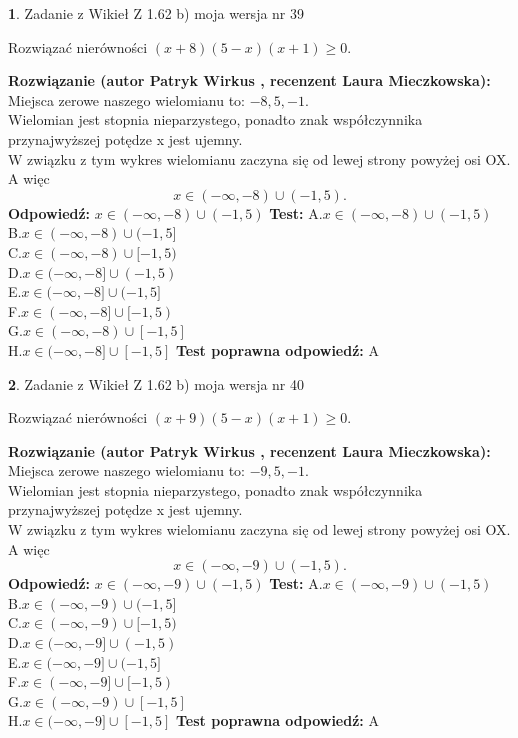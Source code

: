 \documentclass[12pt, a4paper]{article}
\theoremstyle{definition} %
\newtheorem{zad}{}
\newcommand{\zadStart}[1]{\begin{zad}#1\newline}
\newcommand{\zadStop}{\end{zad}}
\newcommand{\rozwStart}[2]{\noindent \textbf{Rozwiązanie (autor #1 , recenzent #2): }\newline}
\newcommand{\rozwStop}{\newline}
\newcommand{\odpStart}{\noindent \textbf{Odpowiedź:}\newline}
\newcommand{\odpStop}{\newline}
\newcommand{\testStart}{\noindent \textbf{Test:}\newline}
\newcommand{\testStop}{\newline}
\newcommand{\kluczStart}{\noindent \textbf{Test poprawna odpowiedź:}\newline}
\newcommand{\kluczStop}{\newline}
\begin{document}
\zadStart{Zadanie z Wikieł Z 1.62 b) moja wersja nr 39}

Rozwiązać nierówności $(x+8)(5-x)(x+1)\ge0$.
\zadStop
\rozwStart{Patryk Wirkus}{Laura Mieczkowska}
Miejsca zerowe naszego wielomianu to: $-8, 5, -1$.\\
Wielomian jest stopnia nieparzystego, ponadto znak współczynnika przy\linebreak najwyższej potędze x jest ujemny.\\ W związku z tym wykres wielomianu zaczyna się od lewej strony powyżej osi OX. A więc $$x \in (-\infty,-8) \cup (-1,5).$$
\rozwStop
\odpStart
$x \in (-\infty,-8) \cup (-1,5)$
\odpStop
\testStart
A.$x \in (-\infty,-8) \cup (-1,5)$\\
B.$x \in (-\infty,-8) \cup (-1,5]$\\
C.$x \in (-\infty,-8) \cup [-1,5)$\\
D.$x \in (-\infty,-8] \cup (-1,5)$\\
E.$x \in (-\infty,-8] \cup (-1,5]$\\
F.$x \in (-\infty,-8] \cup [-1,5)$\\
G.$x \in (-\infty,-8) \cup [-1,5]$\\
H.$x \in (-\infty,-8] \cup [-1,5]$
\testStop
\kluczStart
A
\kluczStop



\zadStart{Zadanie z Wikieł Z 1.62 b) moja wersja nr 40}

Rozwiązać nierówności $(x+9)(5-x)(x+1)\ge0$.
\zadStop
\rozwStart{Patryk Wirkus}{Laura Mieczkowska}
Miejsca zerowe naszego wielomianu to: $-9, 5, -1$.\\
Wielomian jest stopnia nieparzystego, ponadto znak współczynnika przy\linebreak najwyższej potędze x jest ujemny.\\ W związku z tym wykres wielomianu zaczyna się od lewej strony powyżej osi OX. A więc $$x \in (-\infty,-9) \cup (-1,5).$$
\rozwStop
\odpStart
$x \in (-\infty,-9) \cup (-1,5)$
\odpStop
\testStart
A.$x \in (-\infty,-9) \cup (-1,5)$\\
B.$x \in (-\infty,-9) \cup (-1,5]$\\
C.$x \in (-\infty,-9) \cup [-1,5)$\\
D.$x \in (-\infty,-9] \cup (-1,5)$\\
E.$x \in (-\infty,-9] \cup (-1,5]$\\
F.$x \in (-\infty,-9] \cup [-1,5)$\\
G.$x \in (-\infty,-9) \cup [-1,5]$\\
H.$x \in (-\infty,-9] \cup [-1,5]$
\testStop
\kluczStart
A
\kluczStop
\end{document}
